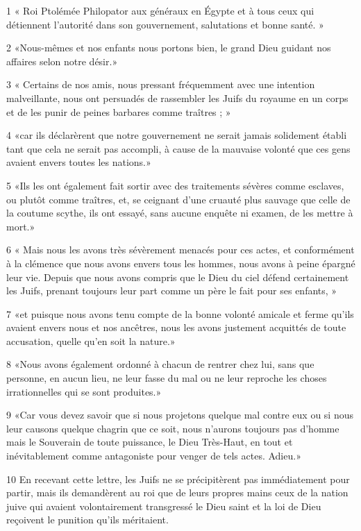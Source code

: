 \par 1 « Roi Ptolémée Philopator aux généraux en Égypte et à tous ceux qui détiennent l'autorité dans son gouvernement, salutations et bonne santé. »
\par 2 «Nous-mêmes et nos enfants nous portons bien, le grand Dieu guidant nos affaires selon notre désir.»
\par 3 « Certains de nos amis, nous pressant fréquemment avec une intention malveillante, nous ont persuadés de rassembler les Juifs du royaume en un corps et de les punir de peines barbares comme traîtres ; »
\par 4 «car ils déclarèrent que notre gouvernement ne serait jamais solidement établi tant que cela ne serait pas accompli, à cause de la mauvaise volonté que ces gens avaient envers toutes les nations.»
\par 5 «Ils les ont également fait sortir avec des traitements sévères comme esclaves, ou plutôt comme traîtres, et, se ceignant d'une cruauté plus sauvage que celle de la coutume scythe, ils ont essayé, sans aucune enquête ni examen, de les mettre à mort.»
\par 6 « Mais nous les avons très sévèrement menacés pour ces actes, et conformément à la clémence que nous avons envers tous les hommes, nous avons à peine épargné leur vie. Depuis que nous avons compris que le Dieu du ciel défend certainement les Juifs, prenant toujours leur part comme un père le fait pour ses enfants, »
\par 7 «et puisque nous avons tenu compte de la bonne volonté amicale et ferme qu'ils avaient envers nous et nos ancêtres, nous les avons justement acquittés de toute accusation, quelle qu'en soit la nature.»
\par 8 «Nous avons également ordonné à chacun de rentrer chez lui, sans que personne, en aucun lieu, ne leur fasse du mal ou ne leur reproche les choses irrationnelles qui se sont produites.»
\par 9 «Car vous devez savoir que si nous projetons quelque mal contre eux ou si nous leur causons quelque chagrin que ce soit, nous n'aurons toujours pas d'homme mais le Souverain de toute puissance, le Dieu Très-Haut, en tout et inévitablement comme antagoniste pour venger de tels actes. Adieu.»
\par 10 En recevant cette lettre, les Juifs ne se précipitèrent pas immédiatement pour partir, mais ils demandèrent au roi que de leurs propres mains ceux de la nation juive qui avaient volontairement transgressé le Dieu saint et la loi de Dieu reçoivent le punition qu'ils méritaient.
